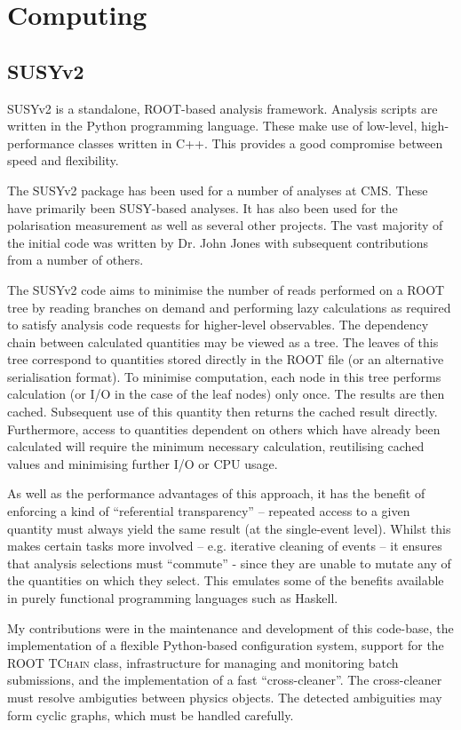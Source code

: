 \chapter{Computing}
\section{\acl{SUSYv2}}
\ac{SUSYv2} is a standalone, \ac{ROOT}-based analysis framework. Analysis
scripts are written in the Python programming language. These make use of
low-level, high-performance classes written in C++. This provides a good
compromise between speed and flexibility.

The \ac{SUSYv2} package has been used for a number of analyses at
\ac{CMS}. These have primarily been \ac{SUSY}-based analyses. It has also been
used for the \PW polarisation measurement as well as several other projects. The
vast majority of the initial code was written by Dr. John Jones with subsequent
contributions from a number of others.

The \ac{SUSYv2} code aims to minimise the number of reads performed on a
\ac{ROOT} tree by reading branches on demand and performing lazy calculations as
required to satisfy analysis code requests for higher-level observables. The
dependency chain between calculated quantities may be viewed as a tree. The
leaves of this tree correspond to quantities stored directly in the \ac{ROOT}
file (or an alternative serialisation format). To minimise computation, each
node in this tree performs calculation (or I/O in the case of the leaf nodes)
only once. The results are then cached. Subsequent use of this quantity then
returns the cached result directly. Furthermore, access to quantities dependent
on others which have already been calculated will require the minimum necessary
calculation, reutilising cached values and minimising further \ac{I/O} or CPU
usage.

As well as the performance advantages of this approach, it has the benefit of
enforcing a kind of ``referential transparency'' -- repeated access to a given
quantity must always yield the same result (at the single-event level). Whilst
this makes certain tasks more involved -- e.g. iterative cleaning of events --
it ensures that analysis selections must ``commute'' - since they are unable to
mutate any of the quantities on which they select. This emulates some of the
benefits available in purely functional programming languages such as Haskell.

My contributions were in the maintenance and development of this code-base, the
implementation of a flexible Python-based configuration system, support for the
\ac{ROOT} \textsc{TChain} class, infrastructure for managing and monitoring
batch submissions, and the implementation of a fast ``cross-cleaner''. The
cross-cleaner must resolve ambiguties between physics objects. The detected
ambiguities may form cyclic graphs, which must be handled carefully.
